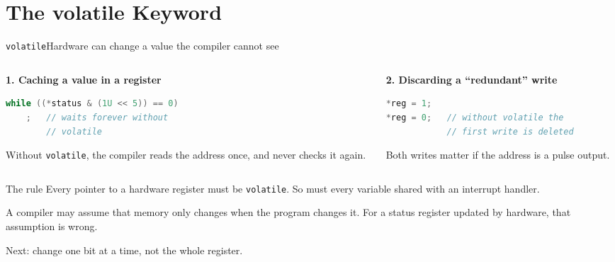 \documentclass[9pt,aspectratio=169,xcolor=table]{beamer}
\begin{document}
\section{The volatile Keyword}

\begin{frame}[fragile]{\texttt{volatile}}{Hardware can change a value the compiler cannot see}
    \begin{columns}[T]
    \begin{column}{.5\textwidth}
        \textbf{1. Caching a value in a register}

        \vspace{1mm}
\begin{lstlisting}[language=C, basicstyle=\ttfamily\small]
while ((*status & (1U << 5)) == 0)
    ;   // waits forever without
        // volatile
\end{lstlisting}

        \vspace{2mm}
        {\small Without \texttt{volatile}, the compiler reads the
        address once, and never checks it again.}
    \end{column}
    \begin{column}{.46\textwidth}
        \textbf{2. Discarding a ``redundant'' write}

        \vspace{1mm}
\begin{lstlisting}[language=C, basicstyle=\ttfamily\small]
*reg = 1;
*reg = 0;   // without volatile the
            // first write is deleted
\end{lstlisting}

        \vspace{2mm}
        {\small Both writes matter if the address is a \alert{pulse
        output}.}
    \end{column}
    \end{columns}

    \vspace{3mm}
    \begin{block}{The rule}
        \alert{Every pointer to a hardware register must be
        \texttt{volatile}. So must every variable shared with an
        interrupt handler.}

        \vspace{1mm}
        A compiler may assume that memory only changes when the
        program changes it. For a status register updated by
        hardware, that assumption is wrong.
    \end{block}

    \vspace{1mm}
    {\small Next: change \alert{one bit} at a time, not the whole register.}
\end{frame}
\end{document}
